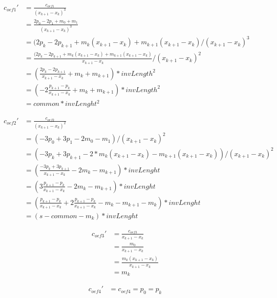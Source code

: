 \documentclass[a4paper]{article}
\begin{document}
\begin{equation*}
\begin{aligned}
	c_{oef1}' &= \frac{c_{oef1}}{(x_{k+1} - x_k)^3} \\
	&= \frac{2p_0 - 2p_1 + m_0 + m_1}{(x_{k+1} - x_k)^3}\\
	&= (2p_k - 2p_{k+1} + m_k (x_{k+1} - x_k) + m_{k+1} (x_{k+1} - x_k) / (x_{k+1} - x_k)^3 \\
	&= \frac {(2p_k - 2p_{k+1} + m_k (x_{k+1} - x_k) + m_{k+1} (x_{k+1} - x_k)}{x_{k+1} - x_k} / (x_{k+1} - x_k)^2 \\
	&= (\frac {2p_k - 2p_{k+1}}{x_{k+1} - x_k} + m_k + m_{k+1}  ) * invLength^2 \\
	&= (-2\frac {p_{k+1}- p_k}{x_{k+1} - x_k} + m_k + m_{k+1}  ) * invLength^2 \\
	&= common * invLenght^2
\end{aligned}
\end{equation*}

\begin{equation*}
\begin{aligned}
	c_{oef2}' &= \frac{c_{oef2}}{(x_{k+1} - x_k)^2} \\
	&= (-3p_0 + 3p_1 - 2m_0 - m_1) / (x_{k+1} - x_k)^2 \\
	&= (-3p_k + 3p_{k+1} - 2* m_k (x_{k+1} - x_k) - m_{k+1} (x_{k+1} - x_k)) / (x_{k+1} - x_k)^2 \\
	&= (\frac{-3p_k + 3p_{k+1}}{x_{k+1} - x_k} - 2m_k - m_{k+1}) * invLenght \\
	&= (3\frac{p_{k+1} - p_k}{x_{k+1} - x_k} - 2m_k - m_{k+1}) * invLenght \\
	&=(\frac{p_{k+1} - p_k}{x_{k+1} - x_k} + 2\frac{p_{k+1} - p_k}{x_{k+1} - x_k} - m_k - m_{k+1} - m_k) * invLenght \\
	&= (s - common - m_k) * invLenght
\end{aligned}
\end{equation*}

\begin{equation*}
\begin{aligned}
	c_{oef3}' &= \frac{c_{oef3}}{x_{k+1} - x_k} \\
	&= \frac{m_0}{x_{k+1} - x_k} \\
	&= \frac{m_k (x_{k+1} - x_k)}{x_{k+1} - x_k} \\
 	&= m_k
\end{aligned}
\end{equation*}

\begin{equation*}
\begin{aligned}
	c_{oef4}' &= c_{oef4} = p_0 = p_k
\end{aligned}
\end{equation*}
\end{document}
